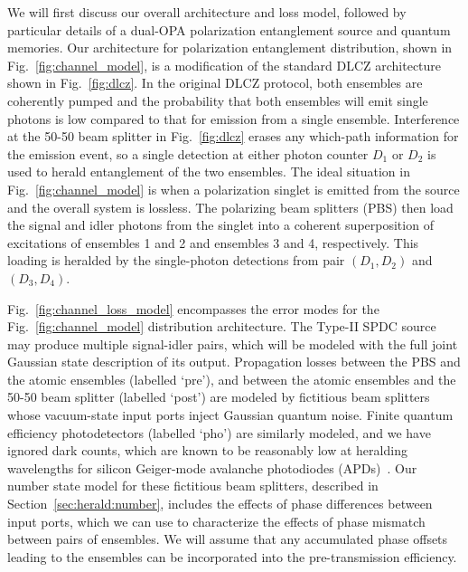 \documentclass[aps,twocolumn,secnumarabic,amsmath,amssymb,pra,groupedaddress,
showpacs, showkeys]{revtex4-1}
\newcommand{\pna}[1]{\left(#1\right)}
\begin{document}
We will first discuss our overall architecture and loss model, followed by
particular details of a dual-OPA polarization entanglement source and quantum
memories. Our architecture for polarization entanglement distribution, shown in
Fig.~\ref{fig:channel_model}, is a modification of the standard DLCZ
architecture shown in Fig.~\ref{fig:dlcz}. In the original DLCZ protocol, both
ensembles are coherently pumped and the probability that both ensembles will
emit single photons is low compared to that for emission from a single
ensemble. Interference at the 50-50 beam splitter in Fig.~\ref{fig:dlcz} erases
any which-path information for the emission event, so a single detection at
either photon counter $D_1$ or $D_2$ is used to herald entanglement of the two
ensembles. The ideal situation in Fig.~\ref{fig:channel_model} is when a
polarization singlet is emitted from the source and the overall system is
lossless. The polarizing beam splitters (PBS) then load the signal and idler
photons from the singlet into a coherent superposition of excitations of
ensembles 1 and 2 and ensembles 3 and 4, respectively. This loading is heralded
by the single-photon detections from pair $\pna{D_1, D_2}$ and $\pna{D_3,
  D_4}$.

Fig.~\ref{fig:channel_loss_model} encompasses the error modes for the
Fig.~\ref{fig:channel_model} distribution architecture. The Type-II SPDC source
may produce multiple signal-idler pairs, which will be modeled with the full
joint Gaussian state description of its output. Propagation losses between the
PBS and the atomic ensembles (labelled `pre'), and between the atomic ensembles
and the 50-50 beam splitter (labelled `post') are modeled by fictitious beam
splitters whose vacuum-state input ports inject Gaussian quantum noise. Finite
quantum efficiency photodetectors (labelled `pho') are similarly modeled, and
we have ignored dark counts, which are known to be reasonably low at heralding
wavelengths for silicon Geiger-mode avalanche photodiodes
(APDs)~\cite{Thomas2010}. Our number state model for these fictitious beam
splitters, described in Section~\ref{sec:herald:number}, includes the effects
of phase differences between input ports, which we can use to characterize the
effects of phase mismatch between pairs of ensembles. We will assume that any
accumulated phase offsets leading to the ensembles can be incorporated into the
pre-transmission efficiency.
\end{document}
